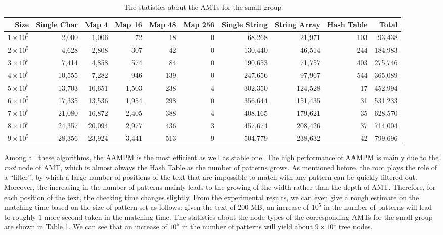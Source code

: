 \documentclass{article}
\begin{document}
\begin{table}[!htp]
  \scriptsize
  \caption{The statistics about the AMTs for the small group}
  \label{tab:small}
  \begin{tabular}{rrrrrrrrrr}
 \hline
 Size &
 Single Char &
 Map 4 &
 Map 16 &
 Map 48 &
 Map 256 &
 Single String &
 String Array   &
 Hash Table &
 Total\\
\hline
$1 \times 10^5$  &  2,000 &  1,006 &    72 &  18 & 0 &  68,268 &  21,971 & 103 &  93,438 \\
$2 \times 10^5$ &  4,628 &  2,808 &   307 &  42 & 0 & 130,440 &  46,514 & 244 & 184,983 \\
$3 \times 10^5$ &  7,414 &  4,858 &   574 &  84 & 0 & 190,653 &  71,757 & 403 & 275,746 \\
$4 \times 10^5$ & 10,555 &  7,282 &   946 & 139 & 0 & 247,656 &  97,967 & 544 & 365,089 \\
$5 \times 10^5$ & 13,703 & 10,651 & 1,503 & 238 & 4 & 302,350 & 124,528 &  17 & 452,994 \\
$6 \times 10^5$ & 17,335 & 13,536 & 1,954 & 298 & 0 & 356,644 & 151,435 &  31 & 531,233 \\
$7 \times 10^5$ & 21,080 & 16,872 & 2,405 & 388 & 4 & 408,165 & 179,621 &  35 & 628,570 \\
$8 \times 10^5$ & 24,357 & 20,094 & 2,977 & 436 & 3 & 457,674 & 208,426 &  37 & 714,004 \\
$9 \times 10^5$ & 28,356 & 23,924 & 3,441 & 513 & 9 & 504,779 & 238,632 &  42 & 799,696 \\
\hline
  \end{tabular}
\end{table}

Among all these algorithms, the \textsf{AAMPM} is the most efficient
as well as stable one. The high performance of \textsf{AAMPM} is
mainly due to the \emph{root} node of AMT, which is almost always the
Hash Table as the number of patterns grows. As mentioned before, the
root plays the role of a ``filter'', by which a large number of
positions of the text that are impossible to match with any pattern
can be quickly filtered out. Moreover, the increasing in the number of
patterns mainly leads to the growing of the width rather than the
depth of AMT. Therefore, for each position of the text, the checking
time changes slightly. From the experimental results, we can even give
a rough estimate on the matching time based on the size of pattern set
as follows: given the text of 200 MB, an increase of $10^5$ in the
number of patterns will lead to roughly $1$ more second taken in the
matching time. The statistics about the node types of the
corresponding AMTs for the small group are shown in Table
\ref{tab:small}. We can see that an increase of $10^5$ in the number
of patterns will yield about $9 \times 10^4$ tree nodes.
\end{document}
